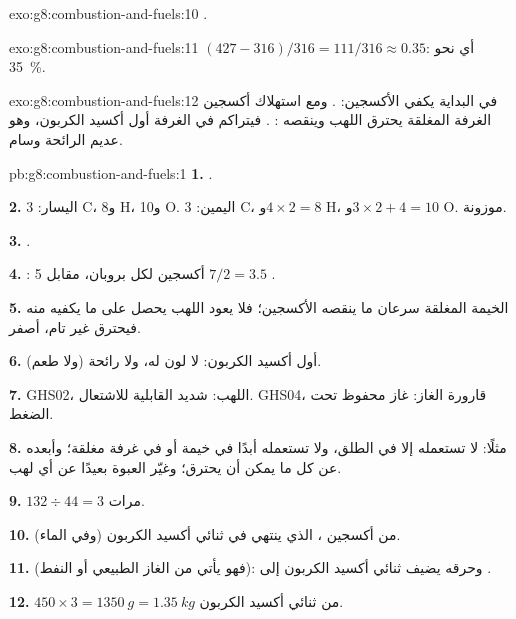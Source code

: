 \begin{solution}{exo:g8:combustion-and-fuels:10}
.
\end{solution}

\begin{solution}{exo:g8:combustion-and-fuels:11}
$(427 - 316)/316 = 111/316 \approx 0.35$: أي نحو \qty{35}{\percent}.
\end{solution}

\begin{solution}{exo:g8:combustion-and-fuels:12}
في البداية يكفي الأكسجين: . ومع استهلاك
أكسجين الغرفة المغلقة يحترق اللهب وينقصه :
. فيتراكم في الغرفة أول أكسيد الكربون،
وهو عديم الرائحة وسام.
\end{solution}

\begin{solution}{pb:g8:combustion-and-fuels:1}
\textbf{1.} .

\textbf{2.} اليسار: 3 C، و8 H، و10 O. اليمين: 3 C، و$4 \times 2 = 8$ H،
و$3 \times 2 + 4 = 10$ O. موزونة.

\textbf{3.} .

\textbf{4.} : 5  أكسجين لكل  بروبان، مقابل
$7/2 = 3.5$ .

\textbf{5.}  الخيمة المغلقة سرعان ما ينقصه الأكسجين؛ فلا يعود اللهب يحصل
على ما يكفيه منه فيحترق  غير تام، أصفر.

\textbf{6.} أول أكسيد الكربون: لا لون له، ولا رائحة (ولا طعم).

\textbf{7.} GHS02، اللهب: شديد القابلية للاشتعال. GHS04، قارورة
الغاز: غاز محفوظ تحت الضغط.

\textbf{8.} مثلًا: لا تستعمله إلا في  الطلق، ولا تستعمله أبدًا في خيمة
أو في غرفة مغلقة؛ وأبعده عن كل ما يمكن أن يحترق؛ وغيّر العبوة بعيدًا عن أي
لهب.

\textbf{9.} $132 \div 44 = 3$ مرات.

\textbf{10.} من أكسجين ، الذي ينتهي في ثنائي أكسيد الكربون (وفي
الماء).

\textbf{11.}  (فهو يأتي من الغاز الطبيعي أو النفط): وحرقه يضيف
ثنائي أكسيد الكربون إلى .

\textbf{12.} $450 \times 3 = \qty{1350}{g} = \qty{1.35}{kg}$ من ثنائي
أكسيد الكربون.
\end{solution}
